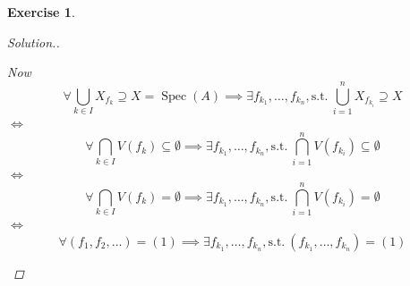 \documentclass{article}
\theoremstyle{breakstyle}
\newtheorem{exercise}{Exercise}
\newenvironment{solution}
  {\begin{proof}[Solution.]\renewcommand{\qedsymbol}{}}
  {\end{proof}}
\DeclareMathOperator{\spec}{Spec}
\begin{document}
\begin{exercise}
\begin{solution}
\begin{enumerate}[label=({\roman*})]
                Now
                $$
                \forall \bigcup_{k \in I} X_{f_{k}}\supseteq X=\spec(A)
                \implies\exists f_{k_{1}},\ldots ,f_{k_{n}},\mathrm{s.t.}\ \bigcup_{i =1} ^{n}X_{f_{k_{i}}}\supseteq X
                $$
                $\Leftrightarrow$ 
                $$
                \forall \bigcap_{k \in I} V(f_{k})\subseteq \emptyset
                \implies\exists f_{k_1},\ldots ,f_{k_{n}},\mathrm{s.t.}\ \bigcap_{i =1} ^{n}V(f_{k_{i}})\subseteq \emptyset
                $$
                $\Leftrightarrow$ 
                $$
                \forall \bigcap_{k \in I} V(f_{k})=\emptyset
                \implies\exists f_{k_1},\ldots ,f_{k_{n}},\mathrm{s.t.}\ \bigcap_{i =1} ^{n}V(f_{k_{i}})=\emptyset
                $$
                $\Leftrightarrow$ 
                $$
                \forall (f_1,f_2,\ldots )=(1)
                \implies\exists f_{k_1},\ldots ,f_{k_{n}},\mathrm{s.t.}\ (f_{k_1},\ldots ,f_{k_{n}})=(1)
                $$


\end{enumerate}
\end{solution}
\end{exercise}
\end{document}
